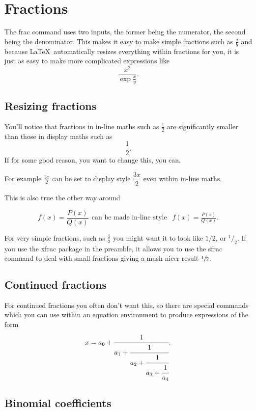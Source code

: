 \documentclass[a4paper,11pt]{article}
\begin{document}
\pagebreak



\section{Fractions}

The frac command  uses two inputs, the former being the numerator, the second being the denominator. This makes it easy to make simple fractions such as $\frac{a}{b}$ and because \LaTeX \, automatically resizes everything within fractions for you, it is just as easy to make more complicated expressions like
\[ 
\frac{x^2}{\exp{\frac{x}{y}}}.
\]

\subsection{Resizing fractions}

You'll notice that fractions in in-line maths such as $\frac{1}{2}$ are significantly smaller than those in display maths such as \[\frac{1}{2}.\] If for some good reason, you want to change this, you can.

For example $\frac{3x}{2}$ can be set to display style $ \dfrac{3x}{2} $ even within in-line maths. 
 
This is also true the other way around
 
\[
f(x)=\frac{P(x)}{Q(x)} \ \  \text{can be made in-line style } \ \ f(x)=\tfrac{P(x)}{Q(x)} .
\]

For very simple fractions, such as $ \frac{1}{2}$ you might want it to look like $1/2$, or $^1/_2$. If you use the xfrac package in the preamble, it allows you to use the sfrac command to deal with small fractions giving a mush nicer result $\sfrac{1}{2}$.


\subsection{Continued fractions}

For continued fractions you often don't want this, so there are special commands which you can use within an equation environment to produce expressions of the form 
\[
   x = a_0 + \cfrac{1}{a_1
           + \cfrac{1}{a_2
           + \cfrac{1}{a_3 
           + \cfrac{1}{a_4} } } }.
\]


\subsection{Binomial coefficients}
\end{document}
